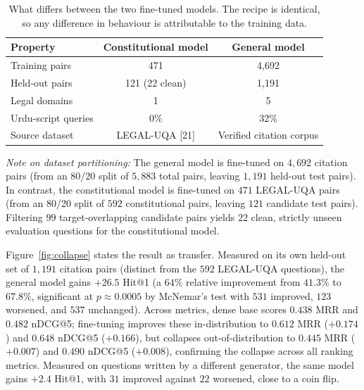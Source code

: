 \documentclass[conference]{IEEEtran}
\begin{document}
\begin{table}[t]
\caption{What differs between the two fine-tuned models. The recipe is
identical, so any difference in behaviour is attributable to the training data.}
\label{tab:setup}
\centering
\footnotesize
\begin{tabular}{@{}lcc@{}}
\toprule
Property & Constitutional model & General model \\
\midrule
Training pairs        & 471 & 4{,}692 \\
Held-out pairs        & 121 (22 clean) & 1{,}191 \\
Legal domains         & 1 & 5 \\
Urdu-script queries   & 0\% & 32\% \\
Source dataset        & LEGAL-UQA [21] & Verified citation corpus \\
\bottomrule
\end{tabular}
\end{table}

\noindent\textit{Note on dataset partitioning:} The general model is fine-tuned on $4{,}692$ citation pairs (from an 80/20 split of $5{,}883$ total pairs, leaving $1{,}191$ held-out test pairs). In contrast, the constitutional model is fine-tuned on $471$ LEGAL-UQA pairs (from an 80/20 split of $592$ constitutional pairs, leaving $121$ candidate test pairs). Filtering $99$ target-overlapping candidate pairs yields $22$ clean, strictly unseen evaluation questions for the constitutional model.

Figure~\ref{fig:collapse} states the result as transfer.
Measured on its own held-out set of $1{,}191$ citation pairs (distinct from the
$592$ LEGAL-UQA questions), the general model gains $+26.5$ Hit@1 (a $64\%$ relative
improvement from $41.3\%$ to $67.8\%$, significant at $p\approx0.0005$ by McNemar's test with
$531$ improved, $123$ worsened, and $537$ unchanged). Across
metrics, dense base scores $0.438$ MRR and $0.482$ nDCG@5; fine-tuning improves these
in-distribution to $0.612$ MRR ($+0.174$) and $0.648$ nDCG@5 ($+0.166$), but collapses
out-of-distribution to $0.445$ MRR ($+0.007$) and $0.490$ nDCG@5 ($+0.008$), confirming the
collapse across all ranking metrics. Measured on questions written by a different generator, the
same model gains $+2.4$ Hit@1, with $31$ improved against $22$ worsened, close to a coin flip.
\end{document}
